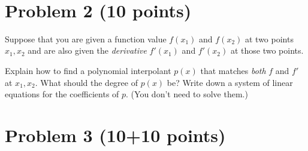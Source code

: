 \documentclass[12pt]{article}
\newcommand{\sol}[1]{}
\newcommand{\sol}[1]{{\color{red} \textbf{Solution: } #1}}
\newcommand{\newexampage}{\newpage $\mbox{}$}
\newcommand{\newexampage}{}
\newcommand{\examvfill}{\vfill}
\newcommand{\examvfill}{}
\begin{document}
\newexampage
\newexampage

\section*{Problem 2 (10 points)}

Suppose that you are given a function value $f(x_1)$ and $f(x_2)$ at two points $x_1, x_2$ and are also given the \emph{derivative} $f'(x_1)$ and $f'(x_2)$ at those two points.

Explain how to find a polynomial interpolant $p(x)$ that matches \emph{both} $f$ and $f'$ at $x_1,x_2$.  What should the degree of $p(x)$ be?  Write down a system of linear equations for the coefficients of $p$.  (You don't need to solve them.)


\sol{

We will have \textbf{four equations} (two constraints on $p$ and two on $p'$), so we need four unknowns, and hence a \textbf{degree-3 polynomial} $p(x) = c_0 + c_1 x + c_2 x^2 + c_3 x^3$ (and hence $p' = c_1 + 2 c_2x + 3c_3 x^2$).

The four equations will be
$$
\begin{pmatrix}
p(x_1) \\
p(x_2) \\
p'(x_1) \\
p'(x_2)
\end{pmatrix} =
\boxed{
\begin{pmatrix}
1 & x_1 & x_1^2 & x_1^3 \\
1 & x_2 & x_2^2 & x_2^3 \\
0 & 1 & 2x_1 & 3x_1^2 \\
0 & 1 & 2x_2 & 3x_2^2 
\end{pmatrix}
\begin{pmatrix}
c_0 \\
c_1 \\
c_2 \\
c_3
\end{pmatrix}
= \begin{pmatrix}
f(x_1) \\
f(x_2) \\
f'(x_1) \\
f'(x_2)
\end{pmatrix}
} \, ,
$$
which is a $4\times 4$ system of equations that is solvable if $x_1 \ne x_2$.

}
\examvfill


\newpage


\section*{Problem 3 (10+10 points)}
\end{document}
